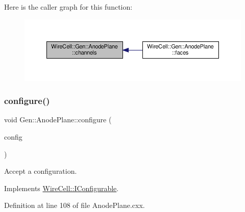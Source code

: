 Here is the caller graph for this function\+:
\nopagebreak
\begin{figure}[H]
\begin{center}
\leavevmode
\includegraphics[width=350pt]{class_wire_cell_1_1_gen_1_1_anode_plane_ad934104bec0191d14920a1ef01cc8f00_icgraph}
\end{center}
\end{figure}
\mbox{\label{class_wire_cell_1_1_gen_1_1_anode_plane_a2d1c7a1dded73fe3b51cbcfb8d9e0e04}} 
\subsubsection{\texorpdfstring{configure()}{configure()}}
{\footnotesize\ttfamily void Gen\+::\+Anode\+Plane\+::configure (\begin{DoxyParamCaption}\item[{const \hyperlink{namespace_wire_cell_a9f705541fc1d46c608b3d32c182333ee}{Wire\+Cell\+::\+Configuration} \&}]{config }\end{DoxyParamCaption})\hspace{0.3cm}{\ttfamily [virtual]}}



Accept a configuration. 



Implements \hyperlink{class_wire_cell_1_1_i_configurable_a57ff687923a724093df3de59c6ff237d}{Wire\+Cell\+::\+I\+Configurable}.



Definition at line 108 of file Anode\+Plane.\+cxx.

